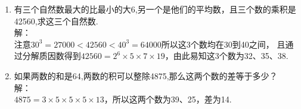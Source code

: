 \documentclass[12pt,oneside,a4paper]{ctexbook} %
\numberwithin{chapter}{part}
\begin{document}
\begin{enumerate}
\item 
有三个自然数最大的比最小的大6,另一个是他们的平均数，且三个数的乘积是42560,求这三个自然数.\\
解：\\
注意$30^3=27000<42560<40^3=64000$所以这3个数均在30到40之间，
且通过分解质因数得到$42560=2^6\times5\times7\times19$，由此易知这3个数为32、35、38.

\item 
如果两数的和是64,两数的积可以整除4875,那么这两个数的差等于多少？\\
解：\\
$4875=3\times5\times5\times5\times13$，所以这两个数为39、25，差为14.

\end{enumerate}
\end{document}
